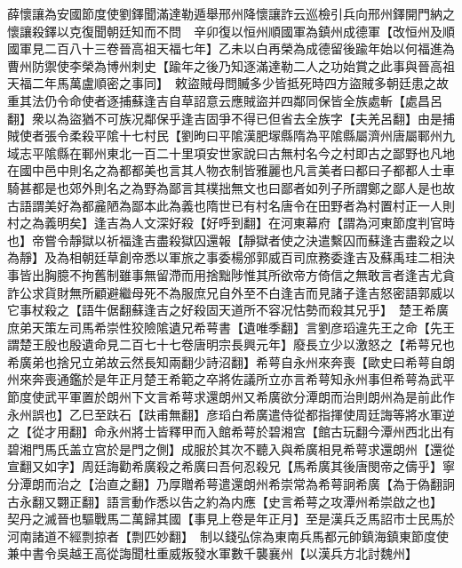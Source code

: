 薛懷讓為安國節度使劉鐸聞滿達勒遁舉邢州降懷讓詐云巡檢引兵向邢州鐸開門納之懷讓殺鐸以克復聞朝廷知而不問　辛卯復以恒州順國軍為鎮州成德軍【改恒州及順國軍見二百八十三卷晉高祖天福七年】乙未以白再榮為成德留後踰年始以何福進為曹州防禦使李榮為博州刺史【踰年之後乃知逐滿達勒二人之功始賞之此事與晉高祖天福二年馬萬盧順密之事同】　敕盜賊母問贓多少皆抵死時四方盜賊多朝廷患之故重其法仍令命使者逐捕蘇逢吉自草詔意云應賊盜并四鄰同保皆全族處斬【處昌呂翻】衆以為盜猶不可族况鄰保乎逢吉固爭不得已但省去全族字【夫羌呂翻】由是捕賊使者張令柔殺平隂十七村民【劉昫曰平隂漢肥塜縣隋為平隂縣屬濟州唐屬鄆州九域志平隂縣在鄆州東北一百二十里項安世家說曰古無村名今之村即古之鄙野也凡地在國中邑中則名之為都都美也言其人物衣制皆雅麗也凡言美者曰都曰子都都人士車騎甚都是也郊外則名之為野為鄙言其樸拙無文也曰鄙者如列子所謂鄭之鄙人是也故古語謂美好為都麄陋為鄙本此為義也隋世已有村名唐令在田野者為村置村正一人則村之為義明矣】逢吉為人文深好殺【好呼到翻】在河東幕府【謂為河東節度判官時也】帝嘗令靜獄以祈福逢吉盡殺獄囚還報【靜獄者使之決遣繫囚而蘇逢吉盡殺之以為靜】及為相朝廷草創帝悉以軍旅之事委楊邠郭威百司庶務委逢吉及蘇禹珪二相決事皆出胸臆不拘舊制雖事無留滯而用捨黜陟惟其所欲帝方倚信之無敢言者逢吉尤貪詐公求貨財無所顧避繼母死不為服庶兄自外至不白逢吉而見諸子逢吉怒密語郭威以它事杖殺之【語牛倨翻蘇逢吉之好殺固天道所不容况怙勢而殺其兄乎】　楚王希廣庶弟天策左司馬希崇性狡險隂遺兄希萼書【遺唯季翻】言劉彦瑫違先王之命【先王謂楚王殷也殷遺命見二百七十七卷唐明宗長興元年】廢長立少以激怒之【希萼兄也希廣弟也捨兄立弟故云然長知兩翻少詩沼翻】希萼自永州來奔喪【歐史曰希萼自朗州來奔喪通鑑於是年正月楚王希範之卒將佐議所立亦言希萼知永州事但希萼為武平節度使武平軍置於朗州下文言希萼求還朗州又希廣欲分潭朗而治則朗州為是前此作永州誤也】乙巳至趺石【趺甫無翻】彦瑫白希廣遣侍從都指揮使周廷誨等將水軍逆之【從才用翻】命永州將士皆釋甲而入館希萼於碧湘宫【館古玩翻今潭州西北出有碧湘門馬氏盖立宫於是門之側】成服於其次不聽入與希廣相見希萼求還朗州【還從宣翻又如字】周廷誨勸希廣殺之希廣曰吾何忍殺兄【馬希廣其後唐閔帝之儔乎】寧分潭朗而治之【治直之翻】乃厚贈希萼遣還朗州希崇常為希萼詗希廣【為于偽翻詗古永翻又翾正翻】語言動作悉以告之約為内應【史言希萼之攻潭州希崇啟之也】　契丹之滅晉也驅戰馬二萬歸其國【事見上卷是年正月】至是漢兵乏馬詔市士民馬於河南諸道不經剽掠者【剽匹妙翻】　制以錢弘倧為東南兵馬都元帥鎮海鎮東節度使兼中書令吳越王高從誨聞杜重威叛發水軍數千襲襄州【以漢兵方北討魏州】

